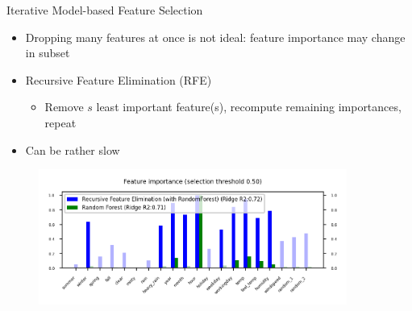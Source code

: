\begin{frame}[allowframebreaks]{Iterative Model-based Feature Selection}
\begin{itemize}
    \item Dropping many features at once is not ideal: feature importance may change in subset
    \item Recursive Feature Elimination (RFE)
    \begin{itemize}
        \item Remove $s$ least important feature(s), recompute remaining importances, repeat
    \end{itemize}
    \item Can be rather slow
\end{itemize}

\begin{figure}
    \centering
    \includegraphics[width=0.9\textwidth]{images/pre-processing/iterative.png}
\end{figure}
\end{frame}


